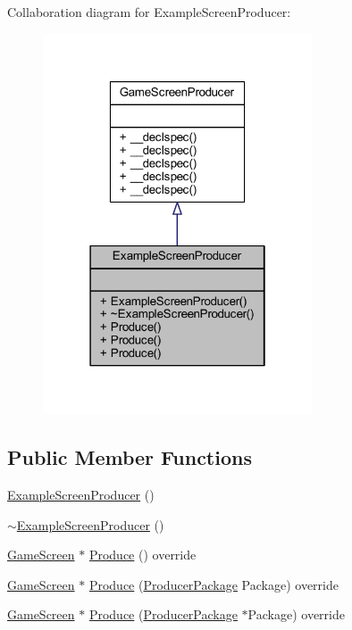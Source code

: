 Collaboration diagram for Example\-Screen\-Producer\-:\nopagebreak
\begin{figure}[H]
\begin{center}
\leavevmode
\includegraphics[width=226pt]{class_example_screen_producer__coll__graph}
\end{center}
\end{figure}
\subsection*{Public Member Functions}
\begin{DoxyCompactItemize}
\item 
\hyperlink{class_example_screen_producer_ac33eb1451e3fbd42bb112e81233dcd31}{Example\-Screen\-Producer} ()
\item 
\hyperlink{class_example_screen_producer_a1243a0aa0a1ecd2a218f9dab7b340213}{$\sim$\-Example\-Screen\-Producer} ()
\item 
\hyperlink{class_game_screen}{Game\-Screen} $\ast$ \hyperlink{class_example_screen_producer_a7eff2a8dd0085b380ba3b41fbf9d0691}{Produce} () override
\item 
\hyperlink{class_game_screen}{Game\-Screen} $\ast$ \hyperlink{class_example_screen_producer_a085da3f4766c2511f82425f66f29e07e}{Produce} (\hyperlink{class_producer_package}{Producer\-Package} Package) override
\item 
\hyperlink{class_game_screen}{Game\-Screen} $\ast$ \hyperlink{class_example_screen_producer_a3c1e2f971c209bc027201a563b0c67c8}{Produce} (\hyperlink{class_producer_package}{Producer\-Package} $\ast$Package) override
\end{DoxyCompactItemize}


